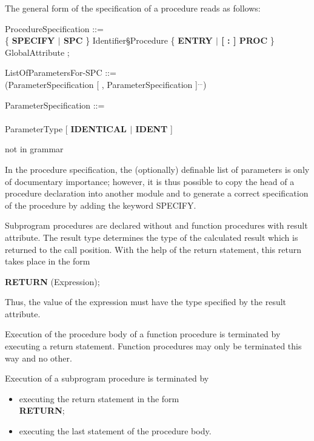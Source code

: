 The general form of the specification of a procedure reads as follows:

\begin{front}
ProcedureSpecification ::=\\
\x \{ {\bf SPECIFY $\mid$ SPC} \} Identifier\S Procedure \{ {\bf ENTRY $\mid$ [ : ] PROC} \} \\
 GlobalAttribute ;

ListOfParametersFor-SPC ::=\\
\x (ParameterSpecification [ , ParameterSpecification ]$^{...}$)

ParameterSpecification ::=\\
\x [ Identifier ] [ VirtualDimensionList ] [ AssignmentProtection ] \\
\x ParameterType [ {\bf IDENTICAL $\mid$ IDENT} ]
\end{front}
\begin{grammar}
not in grammar
\end{grammar}

In the procedure specification, the (optionally) definable list of
parameters is only of documentary importance; however, it is thus
possible to copy the head of a procedure declaration into another module
and to generate a correct specification of the procedure by adding the
keyword SPECIFY.

Subprogram procedures are declared without and function procedures with
result attribute. The result type determines the type of the calculated
result which is returned to the call position. With the help of the
return statement, this return takes place in the form

{\bf RETURN} (Expression);

Thus, the value of the expression must have the type specified by the
result attribute.

Execution of the procedure body of a function procedure is terminated by
executing a return statement. Function procedures may only be terminated
this way and no other.

Execution of a subprogram procedure is terminated by
\begin{itemize}
\item executing the return statement in the form\\
      {\bf RETURN};\\
\item executing the last statement of the procedure body.
\end{itemize}

